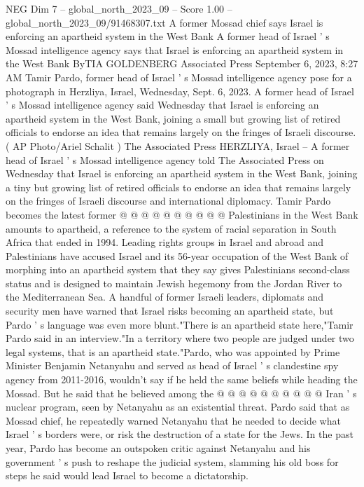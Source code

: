 \begin{textsample}{NEG Dim 7 – global\_north\_2023\_09 – Score 1.00 – global\_north\_2023\_09/91468307.txt}  \label{ex:f7_neg_081}
A former Mossad chief says Israel is enforcing an apartheid system in the West Bank A former head of Israel ' s Mossad intelligence agency says that Israel is enforcing an apartheid system in the West Bank ByTIA GOLDENBERG Associated Press September 6, 2023, 8:27 AM Tamir Pardo, former head of Israel ' s Mossad intelligence agency pose for a photograph in Herzliya, Israel, Wednesday, Sept. 6, 2023.
A former head of Israel ' s Mossad intelligence agency said Wednesday that Israel is enforcing an apartheid system in the West Bank, joining a small but growing list of retired officials to endorse an idea that remains largely on the fringes of Israeli discourse. ( AP Photo/Ariel Schalit ) The Associated Press HERZLIYA, Israel -- A former head of Israel ' s Mossad intelligence agency told The Associated Press on Wednesday that Israel is enforcing an apartheid system in the West Bank, joining a tiny but growing list of retired officials to endorse an idea that remains largely on the fringes of Israeli discourse and international diplomacy.
Tamir Pardo becomes the latest former @ @ @ @ @ @ @ @ @ @ Palestinians in the West Bank amounts to apartheid, a reference to the system of racial separation in South Africa that ended in 1994.
Leading rights groups in Israel and abroad and Palestinians have accused Israel and its 56-year occupation of the West Bank of morphing into an apartheid system that they say gives Palestinians second-class status and is designed to maintain Jewish hegemony from the Jordan River to the Mediterranean Sea.
A handful of former Israeli leaders, diplomats and security men have warned that Israel risks becoming an apartheid state, but Pardo ' s language was even more blunt."There is an apartheid state here,"Tamir Pardo said in an interview."In a territory where two people are judged under two legal systems, that is an apartheid state."Pardo, who was appointed by Prime Minister Benjamin Netanyahu and served as head of Israel ' s clandestine spy agency from 2011-2016, wouldn't say if he held the same beliefs while heading the Mossad.
But he said that he believed among the @ @ @ @ @ @ @ @ @ @ Iran ' s nuclear program, seen by Netanyahu as an existential threat.
Pardo said that as Mossad chief, he repeatedly warned Netanyahu that he needed to decide what Israel ' s borders were, or risk the destruction of a state for the Jews.
In the past year, Pardo has become an outspoken critic against Netanyahu and his government ' s push to reshape the judicial system, slamming his old boss for steps he said would lead Israel to become a dictatorship.

\end{textsample}
